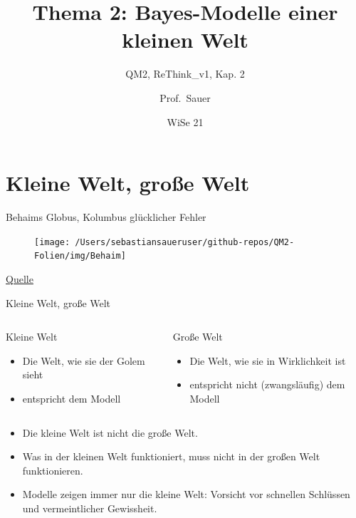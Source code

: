\documentclass[
  ngerman,
  ignorenonframetext,
]{beamer}
\title{Thema 2: Bayes-Modelle einer kleinen Welt}
\subtitle{QM2, ReThink\_v1, Kap. 2}
\author{Prof.~Sauer}
\date{WiSe 21}
\institute{AWM, HS Ansbach}
\providecommand{\tightlist}{%
  \setlength{\itemsep}{0pt}\setlength{\parskip}{0pt}}
\begin{document}
\frame{\titlepage}

\begin{frame}[allowframebreaks]
  \tableofcontents[hideallsubsections]
\end{frame}
\hypertarget{kleine-welt-grouxdfe-welt}{%
\section{Kleine Welt, große Welt}\label{kleine-welt-grouxdfe-welt}}

\begin{frame}{Behaims Globus, Kolumbus glücklicher Fehler}
\protect\hypertarget{behaims-globus-kolumbus-gluxfccklicher-fehler}{}
\begin{figure}[H]
\texttt{[image: /Users/sebastiansaueruser/github-repos/QM2-Folien/img/Behaim]} \end{figure}

\href{https://de.wikipedia.org/wiki/Martin_Behaims_Erdapfel\#/media/Datei:RavensteinBehaim.jpg}{Quelle}
\end{frame}

\begin{frame}{Kleine Welt, große Welt}
\protect\hypertarget{kleine-welt-grouxdfe-welt-1}{}
\begin{columns}[T]
\begin{column}{0.5\textwidth}
\begin{block}{Kleine Welt}
\protect\hypertarget{kleine-welt}{}
\begin{itemize}
\tightlist
\item
  Die Welt, wie sie der Golem sieht
\item
  entspricht dem Modell
\end{itemize}
\end{block}
\end{column}

\begin{column}{0.5\textwidth}
\begin{block}{Große Welt}
\protect\hypertarget{grouxdfe-welt}{}
\begin{itemize}
\tightlist
\item
  Die Welt, wie sie in Wirklichkeit ist
\item
  entspricht nicht (zwangsläufig) dem Modell
\end{itemize}
\end{block}
\end{column}
\end{columns}

\begin{itemize}
\tightlist
\item
  Die kleine Welt ist nicht die große Welt.
\item
  Was in der kleinen Welt funktioniert, muss nicht in der großen Welt
  funktionieren.
\item
  Modelle zeigen immer nur die kleine Welt: Vorsicht vor schnellen
  Schlüssen und vermeintlicher Gewissheit.
\end{itemize}
\end{frame}
\end{document}
